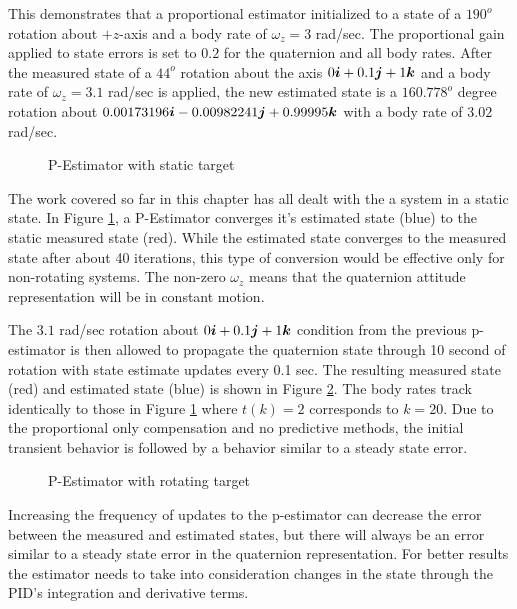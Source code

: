 This demonstrates that a proportional estimator initialized to a state of a $190^o$ rotation about $+z$-axis and a body rate of $\omega_z = 3$ rad/sec.  The proportional gain applied to state errors is set to $0.2$ for the quaternion and all body rates.  After the measured state of a $44^o$ rotation about the axis $0 \boldsymbol{i} + 0.1 \boldsymbol{j} + 1\boldsymbol{k}$ and a body rate of $\omega_z = 3.1$ rad/sec is applied, the new estimated state is a $160.778^o$ degree rotation about $0.00173196 \boldsymbol{i} - 0.00982241 \boldsymbol{j} + 0.99995\boldsymbol{k}$ with a body rate of $3.02$ rad/sec.

\begin{figure}[H]
  \centerline{}
  \caption{P-Estimator with static target}
  \label{fig:PEstimatorwithstatictarget}
\end{figure}

The work covered so far in this chapter has all dealt with the a system in a static state.  In Figure \ref{fig:PEstimatorwithstatictarget}, a P-Estimator converges it's estimated state (blue) to the static measured state (red).  While the estimated state converges to the measured state after about 40 iterations, this type of conversion would be effective only for non-rotating systems.  The non-zero $\omega_z$ means that the quaternion attitude representation will be in constant motion.

The $3.1$ rad/sec rotation about $0\boldsymbol{i} + 0.1\boldsymbol{j} + 1\boldsymbol{k}$ condition from the previous p-estimator is then allowed to propagate the quaternion state through 10 second of rotation with state estimate updates every 0.1 sec.  The resulting measured state (red) and estimated state (blue) is shown in Figure \ref{fig:PEstimatorwithrotatingtarget}.  The body rates track identically to those in Figure \ref{fig:PEstimatorwithstatictarget} where $t(k) = 2$ corresponds to $k = 20$.  Due to the proportional only compensation and no predictive methods, the initial transient behavior is followed by a behavior similar to a steady state error.

\begin{figure}[H]
  \centerline{}
  \caption{P-Estimator with rotating target}
  \label{fig:PEstimatorwithrotatingtarget}
\end{figure}

Increasing the frequency of updates to the p-estimator can decrease the error between the measured and estimated states, but there will always be an error similar to a steady state error in the quaternion representation.  For better results the estimator needs to take into consideration changes in the state through the PID's integration and derivative terms.

